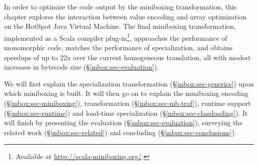 In order to optimize the code output by the miniboxing transformation, this chapter explores the interaction between value encoding and array optimization on the HotSpot Java Virtual Machine. The final miniboxing transformation, implemented as a Scala compiler plug-in\footnote{Available at \url{http://scala-miniboxing.org/}.}, approaches the performance of monomorphic code, matches the performance of specialization, and obtains speedups of up to 22x over the current homogeneous translation, all with modest increases in bytecode size (\S{}\ref{mbox:sec-evaluation}).

We will first explain the specialization transformation (\S\ref{mbox:sec-generics}) upon which miniboxing is built. It will then go on to explain the miniboxing encoding (\S\ref{mbox:sec-miniboxing}), transformation (\S\ref{mbox:sec-mb-traf}), runtime support (\S\ref{mbox:sec-runtime}) and load-time specialization (\S\ref{mbox:sec-classloading}). It will finish by presenting the evaluation (\S\ref{mbox:sec-evaluation}), surveying the related work (\S\ref{mbox:sec-related}) and concluding (\S\ref{mbox:sec-conclusions}).
